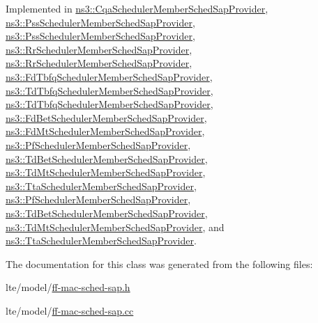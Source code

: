 Implemented in \hyperlink{classns3_1_1CqaSchedulerMemberSchedSapProvider_a70271b0790cb95c275bab34ae175f478}{ns3\+::\+Cqa\+Scheduler\+Member\+Sched\+Sap\+Provider}, \hyperlink{classns3_1_1PssSchedulerMemberSchedSapProvider_a70ebe11edecd1d19fd40e0fcb058b8ab}{ns3\+::\+Pss\+Scheduler\+Member\+Sched\+Sap\+Provider}, \hyperlink{classns3_1_1PssSchedulerMemberSchedSapProvider_a16066f33d5c8c1084c483362c2b0d4bc}{ns3\+::\+Pss\+Scheduler\+Member\+Sched\+Sap\+Provider}, \hyperlink{classns3_1_1RrSchedulerMemberSchedSapProvider_ac54a2ce144bbf33b0d6eee4669f91fcc}{ns3\+::\+Rr\+Scheduler\+Member\+Sched\+Sap\+Provider}, \hyperlink{classns3_1_1RrSchedulerMemberSchedSapProvider_a99b9b13afcd1d359182511e037054632}{ns3\+::\+Rr\+Scheduler\+Member\+Sched\+Sap\+Provider}, \hyperlink{classns3_1_1FdTbfqSchedulerMemberSchedSapProvider_a35689f19a78b8e301b99da93080b6543}{ns3\+::\+Fd\+Tbfq\+Scheduler\+Member\+Sched\+Sap\+Provider}, \hyperlink{classns3_1_1TdTbfqSchedulerMemberSchedSapProvider_add5f151c2ee5f7456008e1e664d0f485}{ns3\+::\+Td\+Tbfq\+Scheduler\+Member\+Sched\+Sap\+Provider}, \hyperlink{classns3_1_1TdTbfqSchedulerMemberSchedSapProvider_af2cfb046ad3cade95c107396c559db60}{ns3\+::\+Td\+Tbfq\+Scheduler\+Member\+Sched\+Sap\+Provider}, \hyperlink{classns3_1_1FdBetSchedulerMemberSchedSapProvider_a7b813b309793f521bb1ad7b41aaf7519}{ns3\+::\+Fd\+Bet\+Scheduler\+Member\+Sched\+Sap\+Provider}, \hyperlink{classns3_1_1FdMtSchedulerMemberSchedSapProvider_ad1df7ddb8ca2f4bde4055703ee1cac4c}{ns3\+::\+Fd\+Mt\+Scheduler\+Member\+Sched\+Sap\+Provider}, \hyperlink{classns3_1_1PfSchedulerMemberSchedSapProvider_a71e105577bf1196c7ef08511d5bc2e88}{ns3\+::\+Pf\+Scheduler\+Member\+Sched\+Sap\+Provider}, \hyperlink{classns3_1_1TdBetSchedulerMemberSchedSapProvider_a38572f1650745d4b678d43da35d734ec}{ns3\+::\+Td\+Bet\+Scheduler\+Member\+Sched\+Sap\+Provider}, \hyperlink{classns3_1_1TdMtSchedulerMemberSchedSapProvider_ac458b36b57a338c1e8f4d74909f93db2}{ns3\+::\+Td\+Mt\+Scheduler\+Member\+Sched\+Sap\+Provider}, \hyperlink{classns3_1_1TtaSchedulerMemberSchedSapProvider_a972d785183619f2c87b784217eb5b056}{ns3\+::\+Tta\+Scheduler\+Member\+Sched\+Sap\+Provider}, \hyperlink{classns3_1_1PfSchedulerMemberSchedSapProvider_a7c42b77ff0c6ddc127fc1fa42f1511fe}{ns3\+::\+Pf\+Scheduler\+Member\+Sched\+Sap\+Provider}, \hyperlink{classns3_1_1TdBetSchedulerMemberSchedSapProvider_a07de483cb055cedb8834f3c602b322f6}{ns3\+::\+Td\+Bet\+Scheduler\+Member\+Sched\+Sap\+Provider}, \hyperlink{classns3_1_1TdMtSchedulerMemberSchedSapProvider_a005f33f911676a6dcea0baeb776d26a1}{ns3\+::\+Td\+Mt\+Scheduler\+Member\+Sched\+Sap\+Provider}, and \hyperlink{classns3_1_1TtaSchedulerMemberSchedSapProvider_aab4ce0bb76f01930e20c5d438e014bc1}{ns3\+::\+Tta\+Scheduler\+Member\+Sched\+Sap\+Provider}.



The documentation for this class was generated from the following files\+:\begin{DoxyCompactItemize}
\item 
lte/model/\hyperlink{ff-mac-sched-sap_8h}{ff-\/mac-\/sched-\/sap.\+h}\item 
lte/model/\hyperlink{ff-mac-sched-sap_8cc}{ff-\/mac-\/sched-\/sap.\+cc}\end{DoxyCompactItemize}
